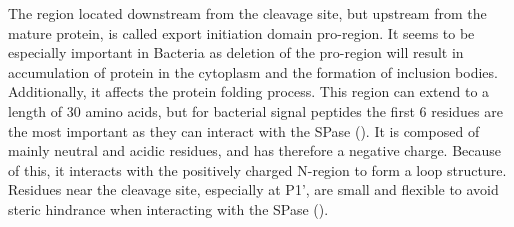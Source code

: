 The region located downstream from the cleavage site, but upstream from the mature protein,
is called export initiation domain pro-region.
It seems to be especially important in Bacteria 
as deletion of the pro-region will result in accumulation of protein in the cytoplasm 
and the formation of inclusion bodies.
Additionally, it affects the protein folding process.
This region can extend to a length of 30 amino acids,
but for bacterial signal peptides the first 6 residues are the most important 
as they can interact with the SPase
(\cite{auclair2012}).
It is composed of mainly neutral and acidic residues, and has therefore a negative charge.
Because of this, it interacts with the positively charged N-region to form a loop structure.
Residues near the cleavage site, especially at P1', are small and flexible 
to avoid steric hindrance when interacting with the SPase
(\cite{owji2018}).

